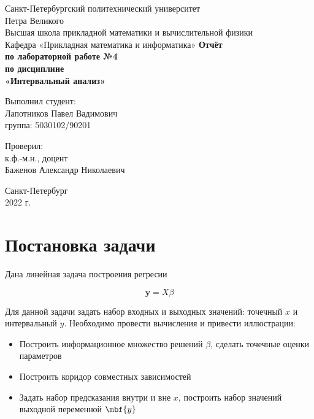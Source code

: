 \documentclass[12pt,a4paper]{article}
\begin{document}
    \begin{titlepage}
		\begin{center}		
			\vfill	
			Санкт-Петербургский политехнический университет \\
			Петра Великого\\
			\vskip 1cm
			Высшая школа прикладной математики и вычислительной физики \\
			Кафедра «Прикладная математика и информатика»
			\vfill
			\textbf{Отчёт\\
				по лабораторной работе №4\\
				по дисциплине\\
				«Интервальный анализ»\\}
			\vfill
		\end{center}
		\vfill
		\hfill
		\begin{minipage}{0.4\textwidth}
			Выполнил студент:\\
			Лапотников Павел Вадимович\\
			группа: 5030102/90201\\
		\end{minipage}
		\vfill
		\hfill 
		\begin{minipage}{0.4\textwidth}
			Проверил:\\
			к.ф.-м.н., доцент\\
			Баженов Александр Николаевич\
		\end{minipage}
		\vfill
		\hfill 
		\begin{center}
			Санкт-Петербург\\2022 г.
		\end{center}
	\end{titlepage}
    	
    	\tableofcontents
    	\listoffigures
    	\pagebreak
\section{Постановка задачи}
Дана линейная задача построения регресии 

\begin{equation}\label{lin_problem}
    \mathbf{y}=X\beta
\end{equation}

Для данной задачи задать набор входных и выходных значений: точечный $x$ и интервальный $y$. Необходимо провести вычисления и привести иллюстрации:
\begin{itemize}
    \item Построить информационное множество решений $\beta$, сделать точечные оценки параметров
    \item Построить коридор совместных зависимостей
    \item Задать набор предсказания внутри и вне $x$, построить набор значений выходной переменной $\mbf{y}$
\end{itemize}
\end{document}
